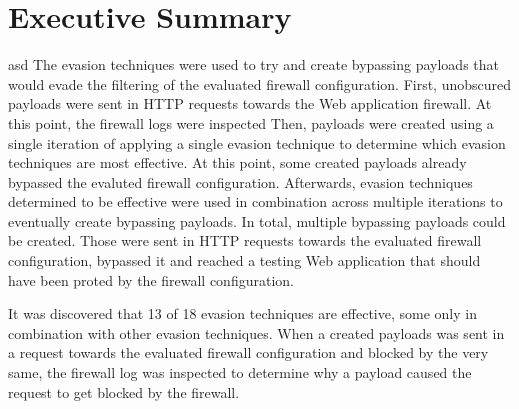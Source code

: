 \section{Executive Summary}
asd
The evasion techniques were used to try and create bypassing payloads that would evade the filtering of the evaluated firewall configuration. 
First, unobscured payloads were sent in HTTP requests towards the Web application firewall.
At this point, the firewall logs were inspected
Then, payloads were created using a single iteration of applying a single evasion technique to determine which evasion techniques are most effective. At this point, some created payloads already bypassed the evaluted firewall configuration.
Afterwards, evasion techniques determined to be effective were used in combination across multiple iterations to eventually create bypassing payloads.
In total, multiple bypassing payloads could be created. Those were sent in HTTP requests towards the evaluated firewall configuration, bypassed it and reached a testing Web application that should have been proted by the firewall configuration.

It was discovered that 13 of 18 evasion techniques are effective, some only in combination with other evasion techniques. 
When a created payloads was sent in a request towards the evaluated firewall configuration and blocked by the very same, the firewall log was inspected to determine why a payload caused the request to get blocked by the firewall. 
